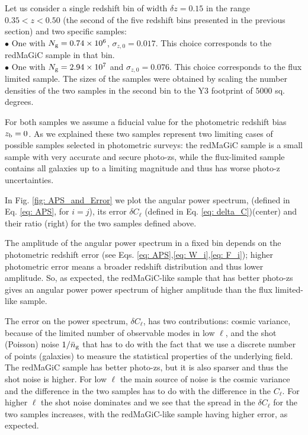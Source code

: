 \documentclass[a4paper,fleqn,usenatbib]{mnras}
\begin{document}
Let us consider a single redshift bin of width $\delta z = 0.15$ in the range $0.35 < z < 0.50$ (the second of the five redshift bins presented in the previous section) and two specific samples:\\
$\bullet$ One with  $N_{\mbox{\scriptsize{g}}}= 0.74 \times 10^6$, $\sigma_{z,0} = 0.017$. This choice corresponds to the  redMaGiC sample in that bin.\\
$\bullet$ One with $N_{\mbox{\scriptsize{g}}}= 2.94 \times 10^7$ and $\sigma_{z,0} = 0.076$. This choice corresponds to the flux limited  sample.
The sizes of the samples were obtained by scaling the number densities of the two samples in the second bin to the Y3 footprint of $5000$ sq. degrees.


For both samples we assume a fiducial value for the photometric redshift bias $z_{\mbox{\scriptsize{b}}} = 0$. As we explained these two samples represent two limiting cases of possible samples selected in photometric surveys: the redMaGiC sample is a small sample with very accurate and secure photo-zs, while the flux-limited sample contains all galaxies up to a limiting magnitude and thus has worse photo-z uncertainties. 

 In Fig. \ref{fig: APS_and_Error} we plot the angular power spectrum, (defined in Eq. \ref{eq: APS}, for $i=j$), its error $\delta C_\ell$ (defined in Eq. \ref{eq: delta_C})(center) and their ratio (right) for the two samples defined above. 

The amplitude of the angular power spectrum in a fixed bin depends on the photometric redshift error (see Eqs. \ref{eq: APS},\ref{eq: W_i},\ref{eq: F_i}); higher photometric error means a broader redshift distribution and thus lower amplitude. So, as expected, the redMaGiC-like sample that has better photo-zs gives an angular power power spectrum of higher amplitude than the flux limited-like sample. 

The error on the power spectrum, $\delta C_{\ell}$, has two contributions: cosmic variance, because of the limited  number of observable modes in low $\ell$, and the shot (Poisson) noise $1/ \bar{n}_{\mbox{\scriptsize{g}}}$ that  has to do with the fact that we use a discrete number of points (galaxies) to measure the statistical properties of the underlying field. The redMaGiC sample has better photo-zs, but it is also sparser and thus the shot noise is higher. For low $\ell$ the main source of noise is the cosmic variance and the difference in the two samples has to do with the difference in the $C_\ell$. For higher $\ell$ the shot noise dominates and we see that  the spread in the $\delta C_{\ell}$ for the two samples increases, with the redMaGiC-like sample having higher error, as expected.  
\end{document}
